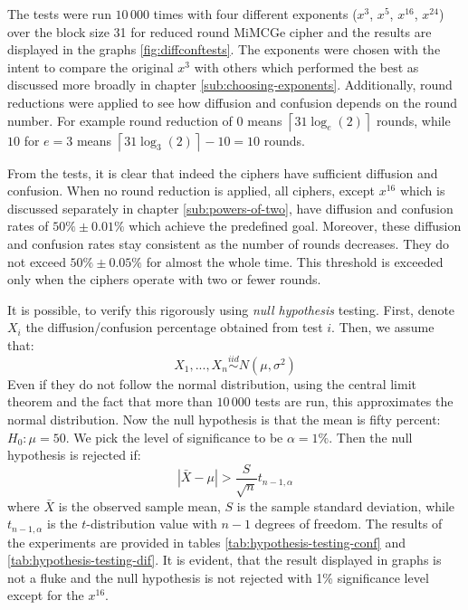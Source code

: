 \documentclass{Resources/UoBLab1}
\theoremstyle{definition}
\begin{document}
The tests were run $10\,000$ times with four different exponents ($x^3$, $x^5$, $x^{16}$, $x^{24}$) over the block size 31 for reduced round MiMCGe cipher and the results are displayed in the graphs \ref{fig:diffconftests}. The exponents were chosen with the intent to compare the original $x^3$ with others which performed the best as discussed more broadly in chapter \ref{sub:choosing-exponents}. Additionally, round reductions were applied to see how diffusion and confusion depends on the round number. For example round reduction of $0$ means $\left\lceil 31\log_e(2) \right\rceil$ rounds, while $10$ for $e = 3$ means \(\left\lceil 31\log_3(2) \right\rceil - 10 = 10\) rounds.

From the tests, it is clear that indeed the ciphers have sufficient diffusion and confusion. When no round reduction is applied, all ciphers, except $x^{16}$ which is discussed separately in chapter \ref{sub:powers-of-two}, have diffusion and confusion rates of $50\% \pm 0.01\%$ which achieve the predefined goal. Moreover, these diffusion and confusion rates stay consistent as the number of rounds decreases. They do not exceed $50\% \pm 0.05\%$ for almost the whole time. This threshold is exceeded only when the ciphers operate with two or fewer rounds.

It is possible, to verify this rigorously using \textit{null hypothesis} testing. First, denote $X_i$ the diffusion/confusion percentage obtained from test $i$. Then, we assume that:
\[
    X_1, ..., X_n \overset{iid}{\sim} N(\mu, \sigma^2)
\]
Even if they do not follow the normal distribution, using the central limit theorem and the fact that more than $10\,000$ tests are run, this approximates the normal distribution. Now the null hypothesis is that the mean is fifty percent: $H_0: \mu = 50$. We pick the level of significance to be $\alpha = 1\%$. Then the null hypothesis is rejected if:
\[
    |\bar{X} - \mu| > \frac{S}{\sqrt{n}}t_{n-1,\alpha}
\]
where $\bar{X}$ is the observed sample mean, $S$ is the sample standard deviation, while $t_{n-1,\alpha}$ is the $t$-distribution value with $n-1$ degrees of freedom. The results of the experiments are provided in tables \ref{tab:hypothesis-testing-conf} and \ref{tab:hypothesis-testing-dif}. It is evident, that the result displayed in graphs is not a fluke and the null hypothesis is not rejected with 1\% significance level except for the $x^{16}$.\medskip
\end{document}
